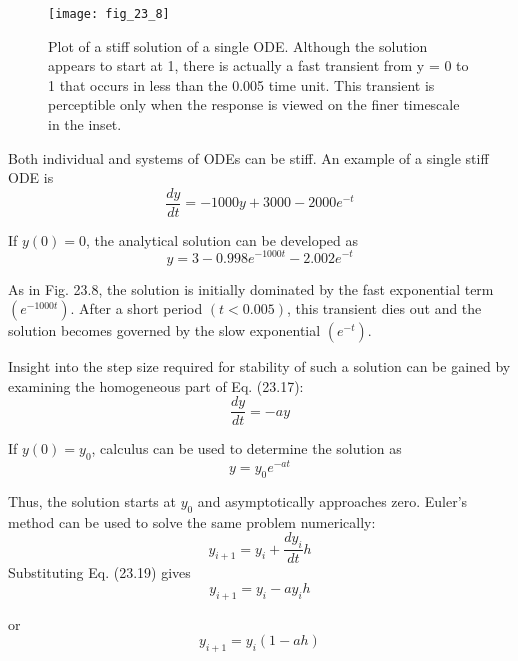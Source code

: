 \documentclass[../main.tex]{subfiles}
\begin{document}
\begin{figure}[H]
    \centering
    \texttt{[image: fig\_23\_8]}
   \caption{\textsf{Plot of a stiff solution of a single ODE. Although the solution appears to start at 1, there is
   actually a fast transient from y = 0 to 1 that occurs in less than the 0.005 time unit. This transient
   is perceptible only when the response is viewed on the finer timescale in the inset.}}\label{fig:fig_23_8}
\end{figure}

Both individual and systems of ODEs can be stiff. An example of a single stiff ODE is
\begin{equation}
    \tag{23.17}
    \frac{d y}{d t}=-1000 y+3000-2000 e^{-t}
\end{equation}

\noindent If $y(0)=0$, the analytical solution can be developed as
\begin{equation}
    \tag{23.18}
    y=3-0.998 e^{-1000 t}-2.002 e^{-t}
\end{equation}

\noindent As in Fig. 23.8, the solution is initially dominated by the fast exponential term $\left(e^{-1000 t}\right)$. After a short period $(t<0.005)$, this transient dies out and the solution becomes governed by the slow exponential $\left(e^{-t}\right)$.

Insight into the step size required for stability of such a solution can be gained by examining the homogeneous part of Eq. (23.17):
\begin{equation}
    \tag{23.19}
    \frac{d y}{d t}=-a y
\end{equation}

\noindent If $y(0)=y_{0}$, calculus can be used to determine the solution as
\begin{equation}
    y=y_{0} e^{-a t} \nonumber
\end{equation}

\noindent Thus, the solution starts at $y_{0}$ and asymptotically approaches zero.
Euler's method can be used to solve the same problem numerically:
\begin{equation}
    y_{i+1}=y_{i}+\frac{d y_{i}}{d t} h \nonumber
\end{equation}
Substituting Eq. (23.19) gives
\begin{equation}
    y_{i+1}=y_{i}-a y_{i} h \nonumber
\end{equation}

\noindent or
\begin{equation}
    \tag{23.20}
    y_{i+1}=y_i(1-ah)
\end{equation}
\end{document}
